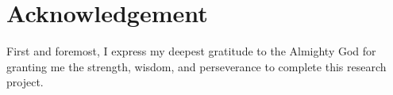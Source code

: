 \section*{Acknowledgement}

First and foremost, I express my deepest gratitude to the Almighty God for granting me the strength, wisdom, and perseverance to complete this research project.

